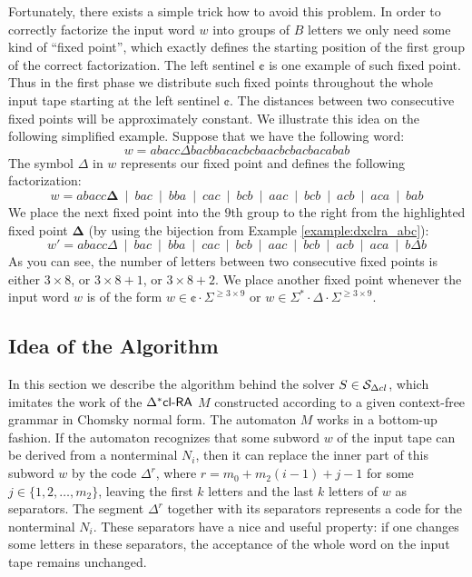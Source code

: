 Fortunately, there exists a simple trick how to avoid this problem. In order to correctly factorize the input word $w$ into groups of $B$ letters we only need some kind of ``fixed point'', which exactly defines the starting position of the first group of the correct factorization. The left sentinel $\cent$ is one example of such fixed point. Thus in the first phase we distribute such fixed points throughout the whole input tape starting at the left sentinel $\cent$. The distances between two consecutive fixed points will be approximately constant. We illustrate this idea on the following simplified example. Suppose that we have the following word:
$$w = abacc \Delta bac bba cac bcb aac bcb acb aca bab$$
The symbol $\Delta$ in $w$ represents our fixed point and defines the following factorization:
$$w = abacc \mathbf{\Delta}\ \mid\ bac\ \mid\ bba\ \mid\ cac\ \mid\ bcb
\ \mid\ aac\ \mid\ bcb\ \mid\ acb\ \mid\ aca\ \mid\ bab$$
We place the next fixed point into the $9$th group to the right from the highlighted fixed point $\mathbf{\Delta}$ (by using the bijection from Example \ref{example:dxclra_abc}):
$$w' = abacc \Delta\ \mid\ bac\ \mid\ bba\ \mid\ cac\ \mid\ bcb\ \mid\ aac\ \mid\ bcb\ \mid\ acb\ \mid\ aca\ \mid\ b \Delta b$$
As you can see, the number of letters between two consecutive fixed points is either  $3 \times 8$, or $3 \times 8 + 1$, or $3 \times 8 + 2$. We place another fixed point whenever the input word $w$ is of the form $w \in \cent \cdot \Sigma^{\ge 3 \times 9}$ or $w \in \Sigma^* \cdot \Delta \cdot \Sigma^{\ge 3 \times 9}$.

\subsection{Idea of the Algorithm}\label{section:dxclra_algorithm}

In this section we describe the algorithm behind the solver $S \in \mathcal{S}_{\Delta cl}$, which imitates the work of the $\textup{\sf $\Delta^*$cl-RA\/}$ $M$ constructed according to a given context-free grammar in Chomsky normal form. The automaton $M$ works in a bottom-up fashion. If the automaton recognizes that some subword $w$ of the input tape can be derived from a nonterminal $N_i$, then it can replace the inner part of this subword $w$ by the code $\Delta^r$, where $r = m_0 + m_2 (i - 1) + j - 1$ for some $j \in \{1, 2, \ldots, m_2\}$, leaving the first $k$ letters and the last $k$ letters of $w$ as separators. The segment $\Delta^r$ together with its separators represents a code for the nonterminal $N_i$. These separators have a nice and useful property: if one changes some letters in these separators, the acceptance of the whole word on the input tape remains
unchanged.

